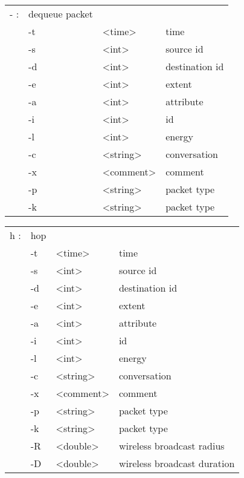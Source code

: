   \begin{tabular}{llll}
  - : & dequeue packet & & \\
    &  -t & <time> & time \\
    &  -s & <int> & source id \\
    &  -d & <int> & destination id \\
    &  -e & <int> & extent \\
    &  -a & <int> & attribute \\
    &  -i & <int> & id \\
    &  -l & <int> & energy \\
    &  -c & <string> & conversation \\
    &  -x & <comment> & comment \\
    &  -p & <string> & packet type \\
    &  -k & <string> & packet type \\
  \end{tabular}

  \begin{tabular}{llll}
  h : & hop & & \\
    &  -t & <time> & time \\
    &  -s & <int> & source id \\
    &  -d & <int> & destination id \\
    &  -e & <int> & extent \\
    &  -a & <int> & attribute \\
    &  -i & <int> & id \\
    &  -l & <int> & energy \\
    &  -c & <string> & conversation \\
    &  -x & <comment> & comment \\
    &  -p & <string> & packet type \\
    &  -k & <string> & packet type \\
    &  -R & <double> & wireless broadcast radius \\
    &  -D & <double> & wireless broadcast duration \\
  \end{tabular}


